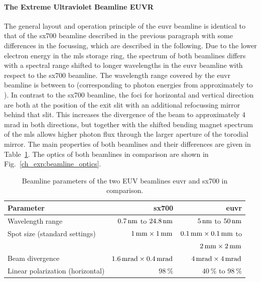 \paragraph{The Extreme Ultraviolet Beamline EUVR}
The general layout and operation principle of the \gls{euvr} beamline is identical to that of the \gls{sx700} beamline described in the previous paragraph with some differences in the focussing, which are described in the following. Due to the lower electron energy in the \gls{mls} storage ring, the spectrum of both beamlines differs with a spectral range shifted to longer wavelengths in the \gls{euvr} beamline with respect to the \gls{sx700} beamline. The wavelength range covered by the \gls{euvr} beamline is between  to  (corresponding to photon energies from approximately  to ). In contrast to the \gls{sx700} beamline, the foci for horizontal and vertical direction are both at the position of the exit slit with an additional refocussing mirror behind that slit. This increases the divergence of the beam to approximately $4$ mrad in both directions, but together with the shifted bending magnet spectrum of the \gls{mls} allows higher photon flux through the larger aperture of the torodial mirror. The main properties of both beamlines and their differences are given in Table~\ref{ch_exp:tbl_beamline_properties}. The optics of both beamlines in comparison are shown in Fig.~\ref{ch_exp:beamline_optics}.
\begin{table}
\centering
\begin{tabular}{lrr}
\toprule
Parameter 			& \gls{sx700} 		& \gls{euvr}\\ \midrule
Wavelength range 		& $\nm{0.7}$ to $\nm{24.8}$ 	& $\nm{5}$ to $\nm{50}$\\
Spot size (standard settings)			& $\mm{1} \times \mm{1}$ 		& $\mm{0.1} \times \mm{0.1}$ to\\ 
&&$\mm{2} \times \mm{2}$\\
Beam divergence			& $\SI{1.6}{\milli\radian}\times \SI{0.4}{\milli\radian}$ 	& $\SI{4}{\milli\radian}\times \SI{4}{\milli\radian}$\\
Linear polarization (horizontal)	& $\SI{98}{\percent}$ 		& $\SI{40}{\percent}$ to $\SI{98}{\percent}$\\
 \bottomrule
\end{tabular}
\caption{Beamline parameters of the two EUV beamlines \gls{euvr} and {sx700} in comparison.}
\label{ch_exp:tbl_beamline_properties}
\end{table}

